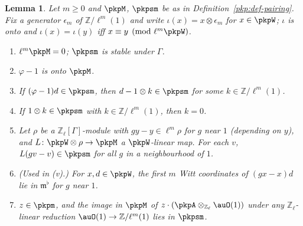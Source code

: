 \documentclass[10pt]{amsart}
\newtheorem{lemma}[theorem]{Lemma}
\theoremstyle{definition}
\theoremstyle{remark}
\newcommand{\Z}{\mathbb Z}
\begin{document}
\begin{lemma}\label{pkp:AS}
Let $m\ge0$ and $\pkpM$, $\pkpsm$ be as in Definition~\ref{pkp:def-pairing}. Fix a generator $\epsilon_m$ of $\Z/\ell^m(1)$ and write $\iota(x)=x\otimes\epsilon_m$
for $x\in\pkpW$; $\iota$ is onto and $\iota(x)=\iota(y)$ iff $x\equiv y\pmod{\ell^m\pkpW}$.
\begin{enumerate}
\item[(i)] $\ell^m\pkpM=0$; $\pkpsm$ is stable under $\Gamma$.
\item[(ii)] $\varphi-1$ is onto $\pkpM$.
\item[(iii)] If $(\varphi-1)d\in\pkpsm$, then $d-1\otimes k\in\pkpsm$ for some $k\in\Z/\ell^m(1)$.
\item[(iv)] If $1\otimes k\in\pkpsm$ with $k\in\Z/\ell^m(1)$, then $k=0$.
\item[(v)] Let $\rho$ be a $\Z_\ell[\Gamma]$-module with $gy-y\in\ell^m\rho$ for $g$ near $1$ (depending
on $y$), and $L\colon\pkpW\otimes\rho\to\pkpM$ a $\pkpW$-linear map. For each $v$, $L(gv-v)\in\pkpsm$
for all $g$ in a neighbourhood of $1$.
\item[(vi)] (Used in (v).) For $x,d\in\pkpW$, the first $m$ Witt coordinates of $(gx-x)d$ lie in
$\mathfrak m^\flat$ for $g$ near $1$.
\item[(vii)] $z\in\pkpm$, and the image in $\pkpM$ of $z\cdot(\pkpA\otimes_{\Z_\ell}\auO(1))$ under any
$\Z_\ell$-linear reduction $\auO(1)\to\Z/\ell^m(1)$ lies in $\pkpsm$.
\end{enumerate}
\end{lemma}
\end{document}

